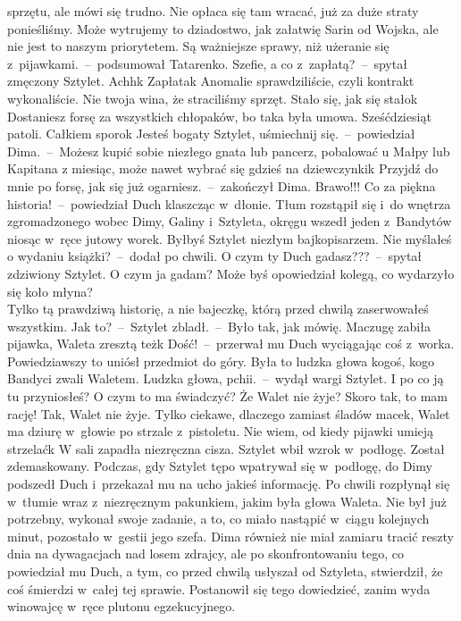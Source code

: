 \documentclass[../MAIN.tex]{subfiles}
\begin{document}
sprzętu, ale mówi się trudno. Nie opłaca się tam wracać, już za duże straty
ponieśliśmy. Może wytrujemy to dziadostwo, jak załatwię Sarin od Wojska, ale nie
jest to naszym priorytetem. Są ważniejsze sprawy, niż użeranie się z~pijawkami.~--~podsumował Tatarenko.
\xx  Szefie, a co z~zapłatą?~--~spytał zmęczony Sztylet.
\xx  Achh\3k Zapłata\3k Anomalie sprawdziliście, czyli kontrakt wykonaliście. Nie
twoja wina, że straciliśmy sprzęt. Stało się, jak się stało\3k Dostaniesz forsę
za wszystkich chłopaków, bo taka była umowa. Sześćdziesiąt patoli. Całkiem
sporo\3k Jesteś bogaty Sztylet, uśmiechnij się.~--~powiedział Dima.~--~Możesz
kupić sobie niezłego gnata lub pancerz, pobalować u Małpy lub Kapitana z
miesiąc, może nawet wybrać się gdzieś na dziewczynki\3k Przyjdź do mnie po
forsę, jak się już ogarniesz.~--~zakończył Dima.
\xx  Brawo!!! Co za piękna historia!~--~powiedział Duch klaszcząc w~dłonie.
Tłum rozstąpił się i~do wnętrza zgromadzonego wobec Dimy, Galiny i~Sztyleta,
okręgu wszedł jeden z~Bandytów niosąc w~ręce jutowy worek.
\xx  Byłbyś Sztylet
niezłym bajkopisarzem. Nie myślałeś o wydaniu książki?~--~dodał po chwili.
\xx  O czym ty Duch gadasz???~--~spytał zdziwiony Sztylet.
\xx  O czym ja gadam? Może byś opowiedział kolegą, co wydarzyło się koło młyna?\\
Tylko tą prawdziwą historię, a nie bajeczkę, którą przed chwilą zaserwowałeś
wszystkim.
\xx  Jak to?~--~Sztylet zbladł.~--~Było tak, jak mówię. Maczugę zabiła pijawka,
Waleta zresztą też\3k
\xx  Dość!~--~przerwał mu Duch wyciągając coś z~worka.
\qm
Powiedziawszy to uniósł przedmiot do góry. Była to ludzka głowa kogoś, kogo
Bandyci zwali Waletem.
\sx  Ludzka głowa, pchii.~--~wydął wargi Sztylet. I po co ją tu przyniosłeś? O
czym to ma świadczyć? Że Walet nie żyje? Skoro tak, to mam rację!
\xx  Tak, Walet nie żyje. Tylko ciekawe, dlaczego zamiast śladów macek, Walet ma
dziurę w~głowie po strzale z~pistoletu. Nie wiem, od kiedy pijawki umieją strzelać\3k
\qm
W sali zapadła niezręczna cisza. Sztylet wbił wzrok w~podłogę. Został
zdemaskowany.
\mm Podczas, gdy Sztylet tępo wpatrywał się w~podłogę, do Dimy podszedł Duch i~przekazał mu na ucho jakieś informację. Po chwili rozpłynął się w~tłumie wraz z~niezręcznym pakunkiem, jakim była głowa Waleta. Nie był już potrzebny, wykonał swoje zadanie, a to, co miało nastąpić w~ciągu kolejnych minut, pozostało w~gestii jego szefa. Dima również nie miał zamiaru tracić reszty dnia na dywagacjach nad losem zdrajcy, ale po skonfrontowaniu tego, co powiedział mu Duch, a tym, co przed chwilą usłyszał od Sztyleta, stwierdził, że coś śmierdzi w~całej tej sprawie. Postanowił się tego dowiedzieć, zanim wyda winowajcę w~ręce plutonu egzekucyjnego.
\end{document}

